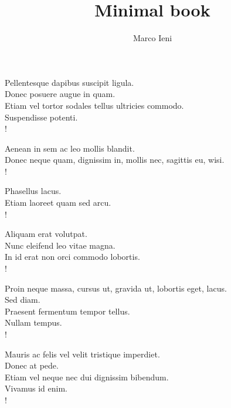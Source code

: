 \documentclass[11pt, a4paper]{article} %
\title{Minimal book}
\author{Marco Ieni}
\begin{document}
\maketitle
\thispagestyle{empty}
\newpage

\tableofcontents
\newpage

\pagestyle{plain}


\begin{cverse}Pellentesque dapibus suscipit ligula. \\
Donec posuere augue in quam. \\
Etiam vel tortor sodales tellus ultricies commodo. \\
Suspendisse potenti. \\!

Aenean in sem ac leo mollis blandit. \\
Donec neque quam, dignissim in, mollis nec, sagittis eu, wisi. \\!

Phasellus lacus. \\
Etiam laoreet quam sed arcu. \\!\end{cverse}
\newpage


\begin{cverse}Aliquam erat volutpat. \\
Nunc eleifend leo vitae magna. \\
In id erat non orci commodo lobortis. \\!

Proin neque massa, cursus ut, gravida ut, lobortis eget, lacus. \\
Sed diam. \\
Praesent fermentum tempor tellus. \\
Nullam tempus. \\!

Mauris ac felis vel velit tristique imperdiet. \\
Donec at pede. \\
Etiam vel neque nec dui dignissim bibendum. \\
Vivamus id enim. \\!\end{cverse}
\newpage
\end{document}
